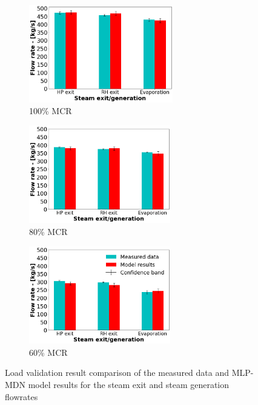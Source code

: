 \documentclass[a4paper,fleqn]{cas-dc}
\begin{document}
\begin{figure}
\centering
\begin{subfigure}{0.33\textwidth}
\includegraphics[width=\linewidth, height = 4.25cm]{100_CASE_STEAM}
        \caption{100\% MCR}
\end{subfigure}\hfill %
\begin{subfigure}{0.33\textwidth}
    \includegraphics[width=\linewidth, height = 4.25cm]{80_CASE_STEAM}
    \caption{80\% MCR}
\end{subfigure}\hfill
\begin{subfigure}{0.33\textwidth}
	\includegraphics[width=\linewidth, height = 4.25cm]{60_CASE_STEAM}
    \caption{60\% MCR}
\end{subfigure}
\caption{Load validation result comparison of the measured data and MLP-MDN model results for the steam exit and  steam generation flowrates}
\label{fig_steam_gen}
\end{figure}
\end{document}
